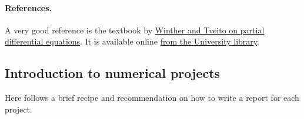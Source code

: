 \documentclass[%
oneside,                 %
final,                   %
10pt]{article}
\begin{document}
\paragraph{References.}
A very good reference is the textbook by \href{{http://www.springer.com/us/book/9783540225515}}{Winther and Tveito on partial differential equations}. It is available online \href{{https://vpn2.uio.no/+CSCO+0h756767633A2F2F797661782E66636576617472652E70627A++/book/10.1007/b138016/page/1}}{from the University library}.


\subsection{Introduction to numerical projects}

Here follows a brief recipe and recommendation on how to write a report for each
project.
\end{document}
